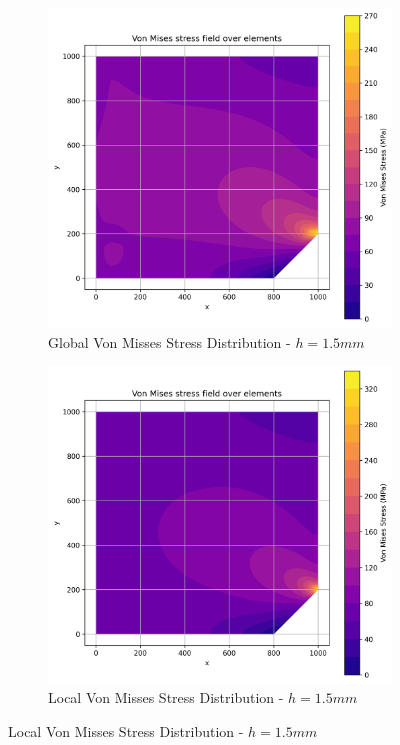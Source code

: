 \begin{figure}[H]
  \centering
  \begin{subfigure}[b]{0.45\textwidth}
    \centering
    \includegraphics[width=\textwidth]{GRAFICOS/Quad9/1.5mm_global/resultados_von_mises.png}
    \caption{Global Von Misses Stress Distribution - $h=1.5mm$}
    \label{fig:img12}
  \end{subfigure}
  \hfill
  \begin{subfigure}[b]{0.45\textwidth}
    \centering
    \includegraphics[width=\textwidth]{GRAFICOS/Quad9/1.5mm_local/resultados_von_mises.png}
    \caption{Local Von Misses Stress Distribution - $h=1.5mm$}
    \label{fig:img22}
  \end{subfigure}
\end{figure}

